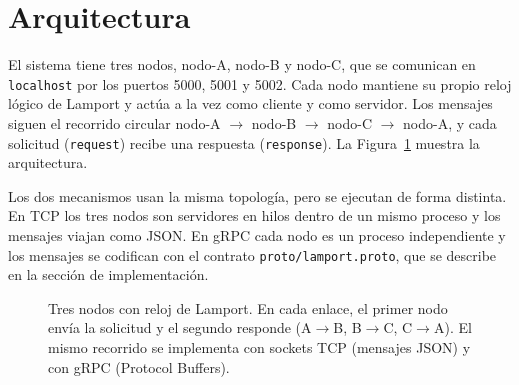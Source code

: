 \section{Arquitectura}

El sistema tiene tres nodos, nodo-A, nodo-B y nodo-C, que se comunican en
\texttt{localhost} por los puertos 5000, 5001 y 5002. Cada nodo mantiene su
propio reloj lógico de Lamport y actúa a la vez como cliente y como servidor.
Los mensajes siguen el recorrido circular
nodo-A $\rightarrow$ nodo-B $\rightarrow$ nodo-C $\rightarrow$ nodo-A, y cada
solicitud (\texttt{request}) recibe una respuesta (\texttt{response}).
La Figura~\ref{fig:arquitectura} muestra la arquitectura.

Los dos mecanismos usan la misma topología, pero se ejecutan de forma distinta.
En TCP los tres nodos son servidores en hilos dentro de un mismo proceso y
los mensajes viajan como JSON. En gRPC cada nodo es un proceso independiente
y los mensajes se codifican con el contrato \texttt{proto/lamport.proto}, que
se describe en la sección de implementación.

\begin{figure}[ht]
\centering
{}
\caption{Tres nodos con reloj de Lamport. En cada enlace, el primer nodo envía la solicitud y el segundo responde (A$\to$B, B$\to$C, C$\to$A). El mismo recorrido se implementa con
sockets TCP (mensajes JSON) y con gRPC (Protocol Buffers).}
\label{fig:arquitectura}
\end{figure}
